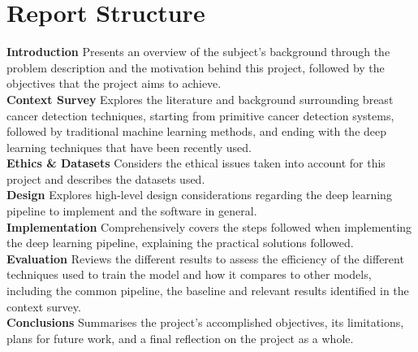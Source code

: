 
\section{Report Structure}

\tab \textbf{Introduction} \space 
Presents an overview of the subject's background through the problem description and the motivation behind this project, followed by the objectives that the project aims to achieve.\\

\textbf{Context Survey} \space
Explores the literature and background surrounding breast cancer detection techniques, starting from primitive cancer detection systems, followed by traditional machine learning methods, and ending with the deep learning techniques that have been recently used.\\

\textbf{Ethics \& Datasets} \space
Considers the ethical issues taken into account for this project and describes the datasets used.\\

\textbf{Design} \space
Explores high-level design considerations regarding the deep learning pipeline to implement and the software in general.\\

\textbf{Implementation} \space
Comprehensively covers the steps followed when implementing the deep learning pipeline, explaining the practical solutions followed.\\

\textbf{Evaluation} \space
Reviews the different results to assess the efficiency of the different techniques used to train the model and how it compares to other models, including the common pipeline, the baseline and relevant results identified in the context survey.\\

\textbf{Conclusions} \space
Summarises the project's accomplished objectives, its limitations, plans for future work, and a ﬁnal reflection on the project as a whole.
